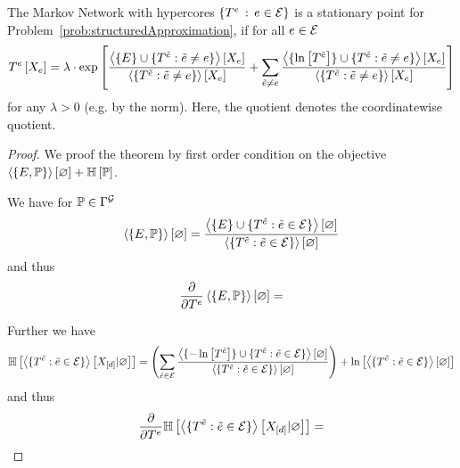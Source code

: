 \begin{theorem}
	The Markov Network with hypercores $\{T^{e}\, : \, e\in\mathcal{E}\}$ is a stationary point for Problem~\ref{prob:structuredApproximation}, if for all $e\in\mathcal{E}$
	\begin{align*}
	T^{e}\left[X_{e}\right]
	= \lambda\cdot \mathrm{exp}\left[
	\frac{
		\left\langle \{E\}\cup\{
		T^{\tilde{e}} : \tilde{e}\neq e
		\}\right\rangle \left[ X_{e} \right] 
	}{
		\left\langle \{
		T^{\tilde{e}} : \tilde{e}\neq e
		\}\right\rangle \left[ X_{e} \right] 
	}
	+ \sum_{\tilde{e}\neq e} 
		\frac{
		\left\langle \{\ln \left[ T^{\tilde{e}} \right]\}\cup\{
		T^{\tilde{e}} : \tilde{e}\neq e
		\}\right\rangle \left[ X_{e} \right] 
	}{
		\left\langle \{
		T^{\tilde{e}} : \tilde{e}\neq e
		\}\right\rangle \left[ X_{e} \right] 
	}
	\right]
	\end{align*}
	for any $\lambda>0$ (e.g. by the norm).
	Here, the quotient denotes the coordinatewise quotient.
\end{theorem}
\begin{proof}
	We proof the theorem by first order condition on the objective $\left\langle \left\{E,\mathbb{P}\right\}\right\rangle \left[ \varnothing \right] + \mathbb{H}\left[\mathbb{P}\right]$.
	
	
	We have for $\mathbb{P}\in\Gamma^{\mathcal{G}}$
	\begin{align*}
		\left\langle \left\{E,\mathbb{P}\right\}\right\rangle \left[ \varnothing \right] 
		=  \frac{
			\left\langle \{E\}\cup\{T^{\tilde{e}} : \tilde{e}\in\mathcal{E}\}\right\rangle \left[ \varnothing \right] 
		}{
			\left\langle \{T^{\tilde{e}} : \tilde{e}\in\mathcal{E}\}\right\rangle \left[ \varnothing \right] 			
		}
	\end{align*}
	and thus
	\begin{align*}
		\frac{\partial }{\partial T^{e}} \left\langle \left\{E,\mathbb{P}\right\}\right\rangle \left[ \varnothing \right] 
		= 
	\end{align*}
	
	
	Further we have
	\begin{align*}
		\mathbb{H}\left[\left\langle \{T^{\tilde{e}} : \tilde{e}\in\mathcal{E}\}\right\rangle \left[ X_{[d]} | \varnothing \right]\right]
		= \left(\sum_{\tilde{e}\in\mathcal{E}} 
			\frac{ 
			\left\langle \{-\ln \left[ T^{\tilde{e}} \right]\} \cup\{T^{\tilde{e}} : \tilde{e}\in\mathcal{E}\}\right\rangle \left[ \varnothing \right]
			}{
			\left\langle \{T^{\tilde{e}} : \tilde{e}\in\mathcal{E}\}\right\rangle \left[ \varnothing \right]
			}\right)
		+ \ln \left[ \left\langle \{T^{\tilde{e}} : \tilde{e}\in\mathcal{E}\}\right\rangle \left[ \varnothing \right] \right]	
	\end{align*}
	and thus
	\begin{align*}
		\frac{\partial }{\partial T^{e}} \mathbb{H}\left[\left\langle \{T^{\tilde{e}} : \tilde{e}\in\mathcal{E}\}\right\rangle \left[ X_{[d]} | \varnothing \right]\right]
		= 
	\end{align*}
	
	
	
\end{proof}

